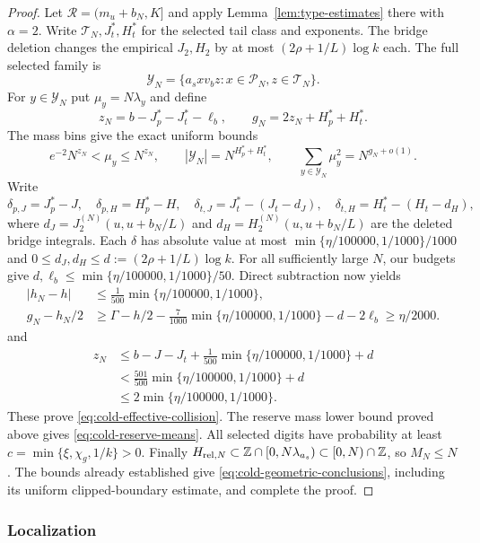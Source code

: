 \begin{proof}
Let $\mathcal R=(m_u+b_N,K]$ and apply
Lemma~\ref{lem:type-estimates} there with $\alpha=2$.
Write $\mathcal T_N,J_t^*,H_t^*$ for the selected tail class and exponents.
The bridge deletion changes the empirical $J_2,H_2$ by at most
$(2\rho+1/L)\log k$ each.
The full selected family is
\[
 \mathcal Y_N=\{a_sxv_bz:x\in\mathcal P_N, z\in\mathcal T_N\}.
\]
For $y\in\mathcal Y_N$ put $\mu_y=N\lambda_y$ and define
\[
 z_N=b-J_p^*-J_t^*-\ell_b,\qquad
 g_N=2z_N+H_p^*+H_t^*.
\]
The mass bins give the exact uniform bounds
\[
 e^{-2}N^{z_N}<\mu_y\le N^{z_N},\qquad
 |\mathcal Y_N|=N^{H_p^*+H_t^*},\qquad
 \sum_{y\in\mathcal Y_N}\mu_y^2=N^{g_N+o(1)}.
\]
Write
\[
 \delta_{p,J}=J_p^*-J,\quad \delta_{p,H}=H_p^*-H,\quad
 \delta_{t,J}=J_t^*-(J_t-d_J),\quad
 \delta_{t,H}=H_t^*-(H_t-d_H),
\]
where $d_J=J_2^{(N)}(u,u+b_N/L)$ and
$d_H=H_2^{(N)}(u,u+b_N/L)$ are the deleted bridge integrals.
Each $\delta$ has absolute value at most $\min\{\eta/100000,1/1000\}/1000$ and
$0\le d_J,d_H\le d:=(2\rho+1/L)\log k$.
For all sufficiently large $N$, our budgets give
$d,\ell_b\le\min\{\eta/100000,1/1000\}/50$. Direct subtraction now yields
\begin{align*}
 |h_N-h|&\le\frac1{500}\min\{\eta/100000,1/1000\},\\
 g_N-h_N/2&\ge\Gamma-h/2
   -\frac7{1000}\min\{\eta/100000,1/1000\}-d-2\ell_b
   \ge\eta/2000.
\end{align*}
and
\begin{align*}
 z_N&\le b-J-J_t+\frac1{500}\min\{\eta/100000,1/1000\}+d\\
    &<\frac{501}{500}\min\{\eta/100000,1/1000\}+d\\
    &\le2\min\{\eta/100000,1/1000\}.
\end{align*}
These prove \eqref{eq:cold-effective-collision}. The reserve mass lower
bound proved above gives \eqref{eq:cold-reserve-means}.
All selected digits have probability at least
$c=\min\{\xi,\chi_g,1/k\}>0$. Finally
$H_{{\rm rel},N}\subset\mathbb Z\cap[0,N\lambda_{a_s})\subset[0,N)\cap\mathbb Z$,
so $M_N\le N$. The bounds already established give
\eqref{eq:cold-geometric-conclusions}, including its uniform clipped-boundary
estimate, and complete the proof.
\end{proof}

\subsubsection{Localization}


